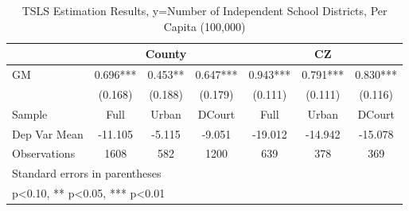 \begin{table}[htbp]\centering
\def\sym#1{\ifmmode^{#1}\else\(^{#1}\)\fi}
\caption{TSLS Estimation Results, y=Number of Independent School Districts, Per Capita (100,000)}
\begin{tabular}{l*{6}{c}}
\toprule
                &\multicolumn{3}{c}{County}            &\multicolumn{3}{c}{CZ}                \\\cmidrule(lr){2-4}\cmidrule(lr){5-7}
\midrule
GM              &    0.696***&    0.453** &    0.647***&    0.943***&    0.791***&    0.830***\\
                &  (0.168)   &  (0.188)   &  (0.179)   &  (0.111)   &  (0.111)   &  (0.116)   \\
\midrule
Sample          &     Full   &    Urban   &   DCourt   &     Full   &    Urban   &   DCourt   \\
Dep Var Mean    &  -11.105   &   -5.115   &   -9.051   &  -19.012   &  -14.942   &  -15.078   \\
Observations    &     1608   &      582   &     1200   &      639   &      378   &      369   \\
\bottomrule
\multicolumn{7}{l}{\footnotesize Standard errors in parentheses}\\
\multicolumn{7}{l}{\footnotesize * p<0.10, ** p<0.05, *** p<0.01}\\
\end{tabular}
\end{table}
